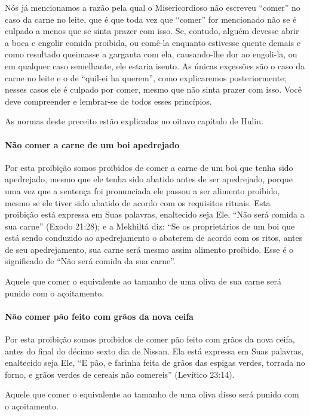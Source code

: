 Nós já mencionamos a razão pela qual o Misericordioso não escreveu
``comer'' no caso da carne no leite, que é que toda vez que ``comer''
for mencionado não se é culpado a menos que se sinta prazer com isso.
Se, contudo, alguém devesse abrir a boca e engolir comida proibida, ou
comê-la enquanto estivesse quente demais e como resultado queimasse a
garganta com ela, causando-lhe dor ao engoli-la, ou em qualquer caso
semelhante, ele estaria isento. As únicas exçessões são o caso da carne
no leite e o de ``quil-ei ha querem'', como explicaremos posteriormente;
nesses casos ele é culpado por comer, mesmo que não sinta prazer com
isso. Você deve compreender e lembrar-se de todos esses princípios.

As normas deste preceito estão explicadas no oitavo capítulo de Hulin.

\paragraph{Não comer a carne de um boi apedrejado}

Por esta proibição somos proibidos de comer a carne de um boi que tenha
sido apedrejado, mesmo que ele tenha sido abatido antes de ser
apedrejado, porque uma vez que a sentença foi pronunciada ele passou a
ser alimento proibido, mesmo se ele tiver sido abatido de acordo com os
requisitos rituais. Esta proibição está expressa em Suas palavras,
enaltecido seja Ele, ``Não será comida a sua carne'' (Exodo 21:28); e a
Mekhiltá diz: ``Se os proprietários de um boi que está sendo conduzido
ao apedrejamento o abaterem de acordo com os ritos, antes de seu
apedrejamento, sua carne será mesmo assim alimento proibido. Esse é o
significado de ``Não será comida da sua carne''.

Aquele que comer o equivalente ao tamanho de uma oliva de sua carne será
punido com o açoitamento.


\paragraph{Não comer pão feito com grãos da nova ceifa}

Por esta proibição somos proibidos de comer pão feito com grãos da nova
ceifa, antes do final do décimo sexto dia de Nissan. Ela está expressa
em Suas palavras, enaltecido seja Ele, ``E pão, e farinha feita de grãos
das espigas verdes, torrada no forno, e grãos verdes de cereais não
comereis'' (Levítico 23:14).

Aquele que comer o equivalente ao tamanho de uma oliva disso será punido
com o açoitamento.

